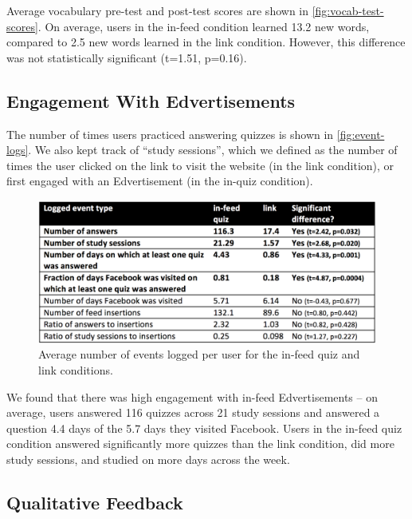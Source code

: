 \documentclass{sigchi}
\begin{document}
Average vocabulary pre-test and post-test scores are shown in \autoref{fig:vocab-test-scores}. On average, users in the in-feed condition learned 13.2 new words, compared to 2.5 new words learned in the link condition. However, this difference was not statistically significant (t=1.51, p=0.16).

\subsection{Engagement With Edvertisements}

The number of times users practiced answering quizzes is shown in \autoref{fig:event-logs}. We also kept track of ``study sessions'', which we defined as the number of times the user clicked on the link to visit the website (in the link condition), or first engaged with an Edvertisement (in the in-quiz condition). %

\begin{figure}
\centering
\includegraphics[width=1.0\columnwidth]{event-logs-feedlearn}
\caption{Average number of events logged per user for the in-feed quiz and link conditions.}
\label{fig:event-logs}
\end{figure}

We found that there was high engagement with in-feed Edvertisements -- on average, users answered 116 quizzes across 21 study sessions and answered a question 4.4 days of the 5.7 days they visited Facebook. Users in the in-feed quiz condition answered significantly more quizzes than the link condition, did more study sessions, and studied on more days across the week. %

\subsection{Qualitative Feedback}
\end{document}
